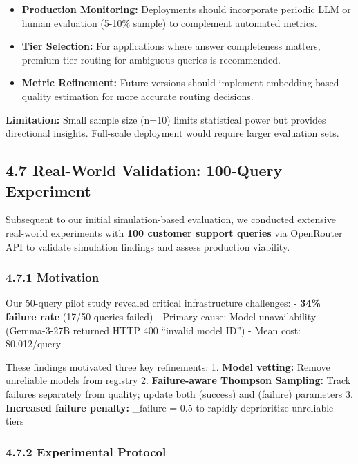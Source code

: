 \documentclass[
]{article}
\providecommand{\tightlist}{%
  \setlength{\itemsep}{0pt}\setlength{\parskip}{0pt}}
\begin{document}
\begin{itemize}
\tightlist
\item
  \textbf{Production Monitoring:} Deployments should incorporate
  periodic LLM or human evaluation (5-10\% sample) to complement
  automated metrics.
\item
  \textbf{Tier Selection:} For applications where answer completeness
  matters, premium tier routing for ambiguous queries is recommended.
\item
  \textbf{Metric Refinement:} Future versions should implement
  embedding-based quality estimation for more accurate routing
  decisions.
\end{itemize}

\textbf{Limitation:} Small sample size (n=10) limits statistical power
but provides directional insights. Full-scale deployment would require
larger evaluation sets.

\hypertarget{real-world-validation-100-query-experiment}{%
\subsection{4.7 Real-World Validation: 100-Query
Experiment}\label{real-world-validation-100-query-experiment}}

Subsequent to our initial simulation-based evaluation, we conducted
extensive real-world experiments with \textbf{100 customer support
queries} via OpenRouter API to validate simulation findings and assess
production viability.

\hypertarget{motivation}{%
\subsubsection{4.7.1 Motivation}\label{motivation}}

Our 50-query pilot study revealed critical infrastructure challenges: -
\textbf{34\% failure rate} (17/50 queries failed) - Primary cause: Model
unavailability (Gemma-3-27B returned HTTP 400 ``invalid model ID'') -
Mean cost: \$0.012/query

These findings motivated three key refinements: 1. \textbf{Model
vetting:} Remove unreliable models from registry 2.
\textbf{Failure-aware Thompson Sampling:} Track failures separately from
quality; update both \alpha (success) and \beta (failure) parameters 3.
\textbf{Increased failure penalty:} \lambda\_failure = 0.5 to rapidly
deprioritize unreliable tiers

\hypertarget{experimental-protocol}{%
\subsubsection{4.7.2 Experimental
Protocol}\label{experimental-protocol}}
\end{document}
